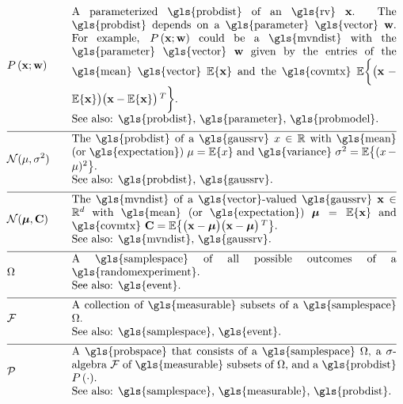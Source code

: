\newpage
\begin{align} 
	&\prob{\featurevec;\weights} &\quad & \parbox{.85\textwidth}{A parameterized \gls{probdist} of an \gls{rv} $\featurevec$. 
		The \gls{probdist} depends on a \gls{parameter} \gls{vector} $\weights$. For example, $\prob{\featurevec;\weights}$ could be a 
		\gls{mvndist} with the \gls{parameter} \gls{vector} $\weights$ given by the entries of the \gls{mean} \gls{vector} $\expect \{ \featurevec \}$ 
		and the \gls{covmtx} $\expect \bigg \{ \big( \featurevec - \expect \{ \featurevec \}\big) \big( \featurevec - \expect \{ \featurevec \}\big)\,^{T}  \bigg\}$.
		\\ See also: \gls{probdist}, \gls{parameter}, \gls{probmodel}.} \nonumber \\[2mm] \hline \nonumber\\[-5mm]
	&\mathcal{N}(\mu, \sigma^{2}) &\quad & \parbox{.85\textwidth}{The \gls{probdist} of a 
		\gls{gaussrv} $\feature \in \mathbb{R}$ with \gls{mean} (or \gls{expectation}) $\mu= \expect \{ \feature \}$ 
		and \gls{variance} $\sigma^{2} =   \expect \big\{  (  \feature - \mu )^2 \big\}$.
		\\ See also: \gls{probdist}, \gls{gaussrv}.} \nonumber \\[2mm] \hline \nonumber\\[-5mm]
	&\mathcal{N}(\meanvecgeneric, \mathbf{C}) &\quad & \parbox{.85\textwidth}{The \gls{mvndist} of a \gls{vector}-valued 
		\gls{gaussrv} $\featurevec \in \mathbb{R}^{\featuredim}$ with \gls{mean} (or \gls{expectation}) $\meanvecgeneric= \expect \{ \featurevec \}$ 
		and \gls{covmtx} $\mathbf{C} =  \expect \big\{ \big( \featurevec - \meanvecgeneric \big)\big( \featurevec - \meanvecgeneric \big)\,^{T} \big\}$.
		\\ See also: \gls{mvndist}, \gls{gaussrv}.} \nonumber \\[2mm] \hline \nonumber\\[-5mm]  
	&\samplespace &\quad & \parbox{.85\textwidth}{A \gls{samplespace} of all possible outcomes of a \gls{randomexperiment}. 
		\\ See also: \gls{event}.}  \nonumber \\[2mm] \hline \nonumber\\[-5mm]
	&\mathcal{F} &\quad & \parbox{.85\textwidth}{A collection of \gls{measurable} subsets of a \gls{samplespace} $\samplespace$. 
		\\ See also: \gls{samplespace}, \gls{event}.}  \nonumber \\[2mm] \hline \nonumber\\[-5mm]
	&\mathcal{P} &\quad & \parbox{.85\textwidth}{A \gls{probspace} that consists of a \gls{samplespace} $\samplespace$, a 
		$\sigma$-algebra $\mathcal{F}$ of \gls{measurable} subsets of $\samplespace$, and a \gls{probdist} $\prob{ \cdot}$.
		\\ See also: \gls{samplespace}, \gls{measurable}, \gls{probdist}.} \nonumber                                       
\end{align}





